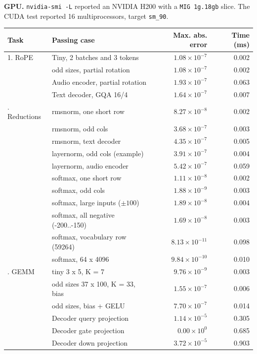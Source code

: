 \par\noindent\textbf{GPU.} \texttt{nvidia-smi -L} reported an NVIDIA H200 with a \texttt{MIG 1g.18gb} slice. The CUDA test reported 16 multiprocessors, target \texttt{sm\_90}.
\begin{center}
\begin{tabular}{@{}llrr@{}}
\toprule
Task & Passing case & Max. abs. error & Time (ms) \\
\midrule
1. RoPE & Tiny, 2 batches and 3 tokens & \(1.08\times 10^{-7}\) & 0.002 \\
 & odd sizes, partial rotation & \(1.08\times 10^{-7}\) & 0.002 \\
 & Audio encoder, partial rotation & \(1.93\times 10^{-7}\) & 0.063 \\
 & Text decoder, GQA 16/4 & \(1.64\times 10^{-7}\) & 0.007 \\
\addlinespace
2. Reductions & rmsnorm, one short row & \(8.27\times 10^{-8}\) & 0.002 \\
 & rmsnorm, odd cols & \(3.68\times 10^{-7}\) & 0.003 \\
 & rmsnorm, text decoder & \(4.35\times 10^{-7}\) & 0.005 \\
 & layernorm, odd cols (example) & \(3.91\times 10^{-7}\) & 0.004 \\
 & layernorm, audio encoder & \(5.42\times 10^{-7}\) & 0.059 \\
 & softmax, one short row & \(1.11\times 10^{-8}\) & 0.002 \\
 & softmax, odd cols & \(1.88\times 10^{-9}\) & 0.003 \\
 & softmax, large inputs ($\pm100$) & \(1.89\times 10^{-8}\) & 0.004 \\
 & softmax, all negative (-200..-150) & \(1.69\times 10^{-8}\) & 0.003 \\
 & softmax, vocabulary row (59264) & \(8.13\times 10^{-11}\) & 0.098 \\
 & softmax, 64 x 4096 & \(9.84\times 10^{-10}\) & 0.010 \\
\addlinespace
3. GEMM & tiny 3 x 5, K = 7 & \(9.76\times 10^{-9}\) & 0.003 \\
 & odd sizes 37 x 100, K = 33, bias & \(1.55\times 10^{-7}\) & 0.006 \\
 & odd sizes, bias + GELU & \(7.70\times 10^{-7}\) & 0.014 \\
 & Decoder query projection & \(1.14\times 10^{-5}\) & 0.305 \\
 & Decoder gate projection & \(0.00\times 10^{0}\) & 0.685 \\
 & Decoder down projection & \(3.72\times 10^{-5}\) & 0.903 \\

\end{tabular}
\end{center}
